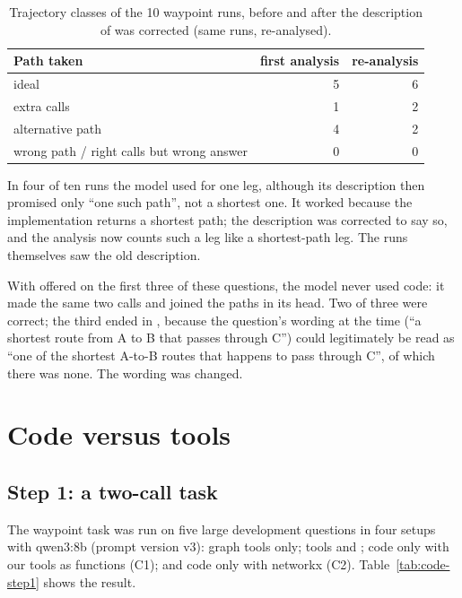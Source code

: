 \begin{table}[ht]
  \centering
  \small
  \caption{Trajectory classes of the 10 waypoint runs, before and after the description of  was
  corrected (same runs, re-analysed).}
  \label{tab:waypoint}
  \begin{tabular}{lrr}
    \toprule
    Path taken & first analysis & re-analysis \\
    \midrule
    ideal & 5 & 6 \\
    extra calls & 1 & 2 \\
    alternative path & 4 & 2 \\
    wrong path / right calls but wrong answer & 0 & 0 \\
    \bottomrule
  \end{tabular}
\end{table}

In four of ten runs the model used  for one leg, although its description then promised only ``one
such path'', not a shortest one. It worked because the implementation returns a shortest path; the description was
corrected to say so, and the analysis now counts such a leg like a shortest-path leg. The runs themselves saw the old
description.

With  offered on the first three of these questions, the model never used code: it made the same two
calls and joined the paths in its head. Two of three were correct; the third ended in , because
the question's wording at the time (``a shortest route from A to B that passes through C'') could legitimately be read
as ``one of the shortest A-to-B routes that happens to pass through C'', of which there was none. The wording was
changed.

\section{Code versus tools}

\subsection{Step 1: a two-call task}

The waypoint task was run on five large development questions in four setups with qwen3:8b (prompt version v3):
graph tools only; tools and ; code only with our tools as functions (C1); and code only with networkx
(C2). Table~\ref{tab:code-step1} shows the result.

